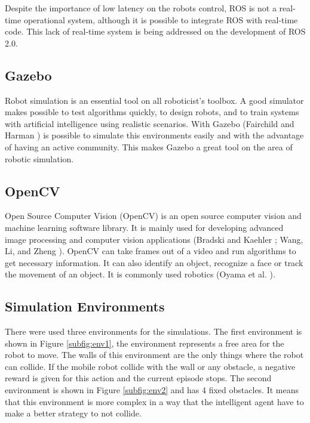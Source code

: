 Despite the importance of low latency on the robots control, ROS is not a real-time operational system, although it is possible to integrate ROS with real-time code. This lack of real-time system is being addressed on the development of ROS 2.0.

\subsection*{Gazebo}

Robot simulation is an essential tool on all roboticist's toolbox.
A good simulator makes possible to test algorithms quickly, to design robots, and to train systems with artificial intelligence using realistic scenarios.
With Gazebo (Fairchild and Harman \citeyear{fairchild2016ros}) is possible to simulate this environments easily and with the advantage of having an active community.
This makes Gazebo a great tool on the area of robotic simulation.

\subsection*{OpenCV}

Open Source Computer Vision (OpenCV) is an open source computer vision and machine learning software library.
It is mainly used for developing advanced image processing and computer vision applications (Bradski and Kaehler \citeyear{bradski2008learning}; Wang, Li, and Zheng \citeyear{wang2010camera}).
OpenCV can take frames out of a video and run algorithms to get necessary information.
It can also identify an object, recognize a face or track the movement of an object.
It is commonly used robotics (Oyama et al. \citeyear{oyama2009come}).

\subsection*{Simulation Environments}

There were used three environments for the simulations. The first environment is  shown in {\color{blue}Figure} \ref{subfig:env1}, the environment represents a free area for the robot to move.
The walls of this environment are the only things where the robot can collide.
If the mobile robot collide with the wall or any obstacle, a negative reward is given for this action and the current episode stops.
The second environment is shown in {\color{blue}Figure} \ref{subfig:env2} and has 4 fixed obstacles.
It means that this environment is more complex in a way that the intelligent agent have to make a better strategy to not collide.



